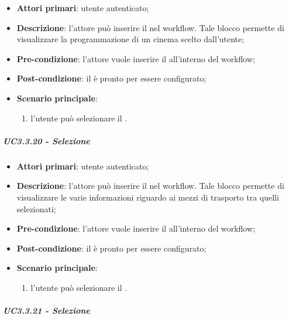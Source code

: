 \begin{itemize}
\item \textbf{Attori primari}: utente autenticato;

\item \textbf{Descrizione}: l'attore può inserire il \BCinema{} nel workflow. Tale blocco permette di visualizzare la programmazione di un cinema scelto dall'utente;

\item \textbf{Pre-condizione}: l'attore vuole inserire il \BCinema{} all'interno del workflow;

\item \textbf{Post-condizione}: il \BCinema{} è pronto per essere configurato;

\item \textbf{Scenario principale}:
\begin{enumerate}
\item  l'utente può selezionare il \BCinema{}.

\end{enumerate}
\end{itemize}

\subparagraph{UC3.3.20 - Selezione \BTrasporti{}}

\begin{itemize}
\item \textbf{Attori primari}: utente autenticato;

\item \textbf{Descrizione}: l'attore può inserire il \BTrasporti{} nel workflow. Tale blocco permette di visualizzare le varie informazioni riguardo ai mezzi di trasporto tra quelli selezionati;

\item \textbf{Pre-condizione}: l'attore vuole inserire il \BCinema{} all'interno del workflow;

\item \textbf{Post-condizione}: il \BTrasporti{} è pronto per essere configurato;

\item \textbf{Scenario principale}:
\begin{enumerate}
\item  l'utente può selezionare il \BTrasporti{}.

\end{enumerate}
\end{itemize}

\subparagraph{UC3.3.21 - Selezione \BLista{}}

